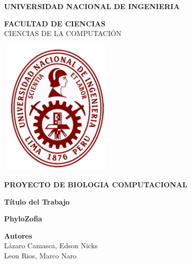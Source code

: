 \documentclass[a4paper]{article}
\begin{document}
\begin{titlepage}
\begin{center}
\vspace*{-0.4in}

{\fontsize{12}{30}\bf \selectfont UNIVERSIDAD NACIONAL DE INGENIERIA\\}

{\fontsize{12}{40}\bf \selectfont FACULTAD DE CIENCIAS\\}
\vspace*{0.15in} CIENCIAS DE LA COMPUTACI\'ON\\
\vspace*{0.2in}


\begin{center}
\includegraphics[width=5.5cm,height=6.5cm]{UNI.png}
\end{center}
\vspace*{0.2in}

\begin{large}
	{\bf PROYECTO DE BIOLOGIA COMPUTACIONAL\\}
	\vspace*{0.3in}
\end{large}

\begin{large}
{\bf T\'itulo del Trabajo\\}
\vspace*{0.2in}
\end{large}

\begin{Large}
\color{blue}
\textbf{PhyloZofia\\}
\color{black}
\end{Large}
\vspace*{0.2in}

\begin{large}
{\bf Autores} 
\vspace*{0.1in}
\\L\'azaro Camasca, Edson Nicks\\
Leon Rios, Marco Naro
\end{large}
\vspace*{0.4in}



\end{center}
\end{titlepage}
\end{document}
